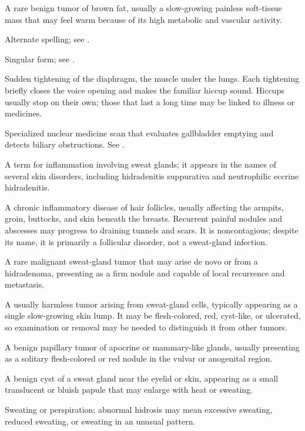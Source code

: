  A rare benign tumor of brown fat, usually a slow-growing painless soft-tissue mass that may feel warm because of its high metabolic and vascular activity.

 Alternate spelling; see .

 Singular form; see .

 Sudden tightening of the diaphragm, the muscle under the lungs. Each tightening briefly closes the voice opening and makes the familiar hiccup sound. Hiccups usually stop on their own; those that last a long time may be linked to illness or medicines.

 Specialized nuclear medicine scan that evaluates gallbladder emptying and detects biliary obstructions. See .

 A term for inflammation involving sweat glands; it appears in the names of several skin disorders, including hidradenitis suppurativa and neutrophilic eccrine hidradenitis.

 A chronic inflammatory disease of hair follicles, usually affecting the armpits, groin, buttocks, and skin beneath the breasts. Recurrent painful nodules and abscesses may progress to draining tunnels and scars. It is noncontagious; despite its name, it is primarily a follicular disorder, not a sweat-gland infection.

 A rare malignant sweat-gland tumor that may arise de novo or from a hidradenoma, presenting as a firm nodule and capable of local recurrence and metastasis.

 A usually harmless tumor arising from sweat-gland cells, typically appearing as a single slow-growing skin lump. It may be flesh-colored, red, cyst-like, or ulcerated, so examination or removal may be needed to distinguish it from other tumors.

 A benign papillary tumor of apocrine or mammary-like glands, usually presenting as a solitary flesh-colored or red nodule in the vulvar or anogenital region.

 A benign cyst of a sweat gland near the eyelid or skin, appearing as a small translucent or bluish papule that may enlarge with heat or sweating.

 Sweating or perspiration; abnormal hidrosis may mean excessive sweating, reduced sweating, or sweating in an unusual pattern.

